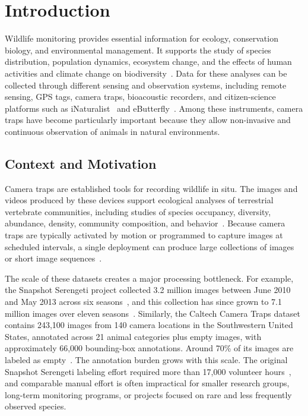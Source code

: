 \chapter[Introduction]{Introduction}\label{cap:introduction}

Wildlife monitoring provides essential information for ecology, conservation biology, and environmental management. It supports the study of species distribution, population dynamics, ecosystem change, and the effects of human activities and climate change on biodiversity~\citep{ahumada2013monitoring, he2016visual, tuia2022perspectives, bruce2025large, lindenmayer2022we}. Data for these analyses can be collected through different sensing and observation systems, including remote sensing, GPS tags, camera traps, bioacoustic recorders, and citizen-science platforms such as iNaturalist~\citep{horn2018inat, shepley2021automated, herrera2025inaturalist} and eButterfly~\citep{prudic2017ebutterfly}. Among these instruments, camera traps have become particularly important because they allow non-invasive and continuous observation of animals in natural environments.

\section{Context and Motivation}

Camera traps are established tools for recording wildlife in situ. The images and videos produced by these devices support ecological analyses of terrestrial vertebrate communities, including studies of species occupancy, diversity, abundance, density, community composition, and behavior~\citep{ahumada2013monitoring, beery2021iwildcam, tanwar2021camera, delisle2021next}. Because camera traps are typically activated by motion or programmed to capture images at scheduled intervals, a single deployment can produce large collections of images or short image sequences~\citep{he2016visual}.

The scale of these datasets creates a major processing bottleneck. For example, the Snapshot Serengeti project collected 3.2 million images between June 2010 and May 2013 across six seasons~\citep{swanson2015snapshot}, and this collection has since grown to 7.1 million images over eleven seasons~\citep{ss_lila}. Similarly, the Caltech Camera Traps dataset contains 243,100 images from 140 camera locations in the Southwestern United States, annotated across 21 animal categories plus empty images, with approximately 66,000 bounding-box annotations. Around 70\% of its images are labeled as empty~\citep{beery2018recognition}. The annotation burden grows with this scale. The original Snapshot Serengeti labeling effort required more than 17,000 volunteer hours~\citep{norouzzadeh2018automatically}, and comparable manual effort is often impractical for smaller research groups, long-term monitoring programs, or projects focused on rare and less frequently observed species.

